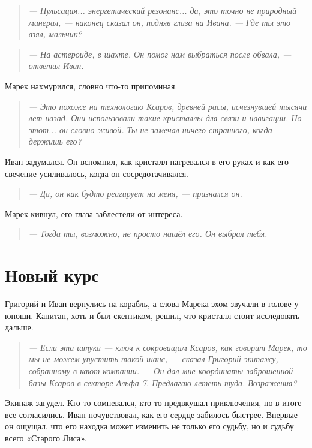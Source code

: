 \documentclass[12pt,a4paper]{book} %
\newenvironment{dialogue}{\begin{quote}\itshape}{\end{quote}}
\begin{document}
\begin{dialogue}
--- Пульсация... энергетический резонанс... да, это точно не природный минерал, --- наконец сказал он, подняв глаза на Ивана. --- Где ты это взял, мальчик?
\end{dialogue}

\begin{dialogue}
--- На астероиде, в шахте. Он помог нам выбраться после обвала, --- ответил Иван.
\end{dialogue}

Марек нахмурился, словно что-то припоминая.

\begin{dialogue}
--- Это похоже на технологию Ксаров, древней расы, исчезнувшей тысячи лет назад. Они использовали такие кристаллы для связи и навигации. Но этот... он словно живой. Ты не замечал ничего странного, когда держишь его?
\end{dialogue}

Иван задумался. Он вспомнил, как кристалл нагревался в его руках и как его свечение усиливалось, когда он сосредотачивался.

\begin{dialogue}
--- Да, он как будто реагирует на меня, --- признался он.
\end{dialogue}

Марек кивнул, его глаза заблестели от интереса.

\begin{dialogue}
--- Тогда ты, возможно, не просто нашёл его. Он выбрал тебя.
\end{dialogue}

\section*{Новый курс}

Григорий и Иван вернулись на корабль, а слова Марека эхом звучали в голове у юноши. Капитан, хоть и был скептиком, решил, что кристалл стоит исследовать дальше.

\begin{dialogue}
--- Если эта штука --- ключ к сокровищам Ксаров, как говорит Марек, то мы не можем упустить такой шанс, --- сказал Григорий экипажу, собранному в кают-компании. --- Он дал мне координаты заброшенной базы Ксаров в секторе Альфа-7. Предлагаю лететь туда. Возражения?
\end{dialogue}

Экипаж загудел. Кто-то сомневался, кто-то предвкушал приключения, но в итоге все согласились. Иван почувствовал, как его сердце забилось быстрее. Впервые он ощущал, что его находка может изменить не только его судьбу, но и судьбу всего «Старого Лиса».
\end{document}
